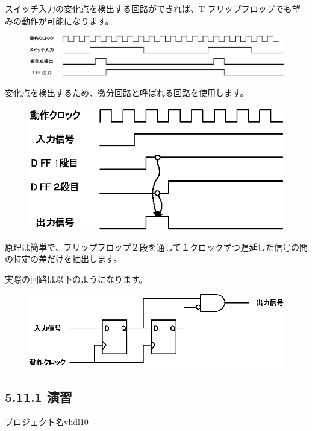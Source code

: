\documentclass[letterpaper,10pt,dvipdfmx]{sphinxmanual}
\begin{document}
スイッチ入力の変化点を検出する回路ができれば、T フリップフロップでも望みの動作が可能になります。
\begin{figure}[htbp]
\centering

\includegraphics{figure23.eps}
\end{figure}

変化点を検出するため、微分回路と呼ばれる回路を使用します。
\begin{figure}[htbp]
\centering

\includegraphics{figure24.eps}
\end{figure}

原理は簡単で、フリップフロップ２段を通して１クロックずつ遅延した信号の間の特定の差だけを抽出します。

実際の回路は以下のようになります。
\begin{figure}[htbp]
\centering

\includegraphics{figure25.eps}
\end{figure}


\subsection{5.11.1 演習}
\label{05_try:id19}
プロジェクト名vhdl10
\end{document}
